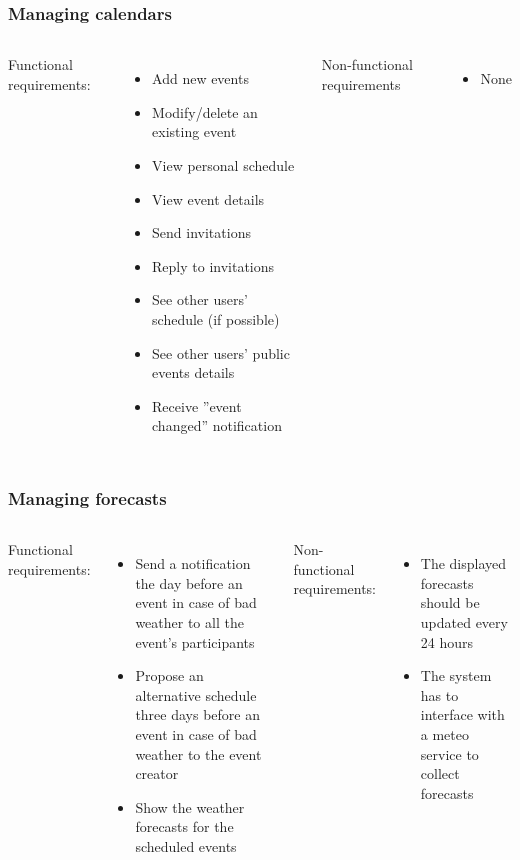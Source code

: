 \documentclass[professionalfont]{beamer}
\begin{document}
\begin{frame}
\frametitle{Managing calendars}
\begin{columns}[c]
Functional requirements:
\begin{itemize}
\item Add new events
\item Modify/delete an existing event
\item View personal schedule
\item View event details
\item Send invitations
\item Reply to invitations
\item See other users' schedule (if possible)
\item See other users' public events details
\item Receive ''event changed'' notification
\end{itemize}
Non-functional requirements
\begin{itemize}
\item None
\end{itemize}
\end{columns}
\end{frame}

\begin{frame}
\frametitle{Managing forecasts}
\begin{columns}[c]
Functional requirements:
\begin{itemize}
\item Send a notification the day before an event in case of bad weather to all the event's participants
\item Propose an alternative schedule three days before an event in case of bad weather to the event creator
\item Show the weather forecasts for the scheduled events
\end{itemize}
Non-functional requirements:
\begin{itemize}
\item The displayed forecasts should be updated every 24 hours
\item The system has to interface with a meteo service to collect forecasts
\end{itemize}
\end{columns}
\end{frame}
\end{document}
